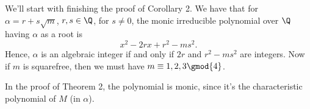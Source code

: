 \documentclass[letter,12pt]{article}
\begin{document}
We'll start with finishing the proof of Corollary 2. We have that for $\alpha=r+s\sqrt{m}$, $r,s\in \Q$, for $s\ne 0$, the monic irreducible polynomial over $\Q$ having $\alpha$ as a root is
\[
x^2-2rx+r^2-ms^2.
\]
Hence, $\alpha$ is an algebraic integer if and only if $2r$ and $r^2-m s^2$ are integers. Now if $m$ is squarefree, then we must have $m\equiv 1,2,3\gmod{4}$.

In the proof of Theorem 2, the polynomial is monic, since it's the characteristic polynomial of $M$ (in $\alpha$).
\end{document}
